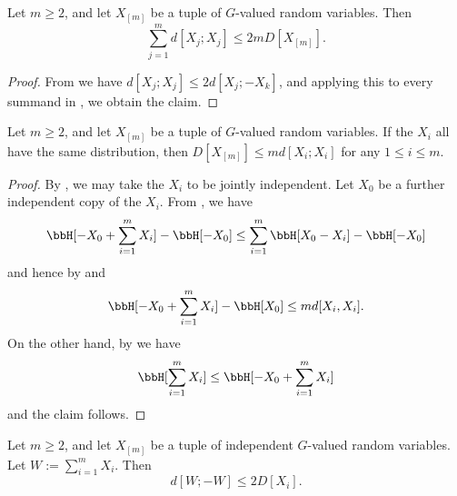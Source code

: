 \begin{lemma}\label{multidist-ruzsa-II}\leanok
  Let $m \ge 2$, and let $X_{[m]}$ be a tuple of $G$-valued random variables. Then
  $$\sum_{j=1}^m d[X_j;X_j] \leq 2 m D[X_{[m]}].$$
\end{lemma}

\begin{proof}\leanok
From  we have $d[X_j;X_j] \leq 2 d[X_j;-X_k]$, and applying this to every summand in , we obtain the claim.
\end{proof}

\begin{lemma}\label{multidist-ruzsa-III}\leanok
  Let $m \ge 2$, and let $X_{[m]}$ be a tuple of $G$-valued random variables. If the $X_i$ all have the same distribution, then $D[X_{[m]}] \leq m d[X_i;X_i]$ for any $1 \leq i \leq m$.
\end{lemma}

\begin{proof}\leanok
  By ,  we may take the $X_i$ to be jointly independent.    Let $X_0$ be a further independent copy of the $X_i$.
From , we have
$$ \bbH[-X_0 + \sum_{i=1}^m X_i] - \bbH[-X_0] \leq \sum_{i=1}^m \bbH[X_0 - X_i] - \bbH[-X_0]$$
and hence by  and 
$$ \bbH[-X_0 + \sum_{i=1}^m X_i] - \bbH[X_0] \leq m d[X_i,X_i].$$
On the other hand, by  we have
$$ \bbH[\sum_{i=1}^m X_i] \leq \bbH[-X_0 + \sum_{i=1}^m X_i]$$
and the claim follows.
\end{proof}

\begin{lemma}\label{multidist-ruzsa-IV}\leanok
  Let $m \ge 2$, and let $X_{[m]}$ be a tuple of independent $G$-valued random variables.  Let $W := \sum_{i=1}^m X_i$. Then
  $$ d[W;-W] \leq 2 D[X_i].$$
\end{lemma}


